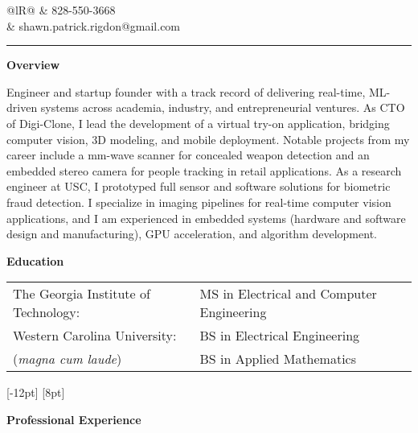\documentclass[14pt,letterpaper]{extarticle}
\begin{document}
\pagestyle{empty}

\newcommand{\newsection}[1]{
\bigskip\medskip
\noindent\textbf{\large{#1}}
}


\noindent
\begin{tabularx}{\linewidth}{@{}lR@{}}
 & \footnotesize{828-550-3668} \\[-4pt]
& \footnotesize{shawn.patrick.rigdon@gmail.com} \\[-4pt]
\end{tabularx}

\smallskip
\noindent\rule[\baselineskip]{\linewidth}{1.5pt}


\noindent\textbf{\large{Overview}}

\medskip
\noindent\footnotesize{Engineer and startup founder with a track record of delivering real-time,
ML-driven systems across academia, industry, and entrepreneurial ventures. As CTO of Digi-Clone,
I lead the development of a virtual try-on application, bridging computer vision, 3D modeling,
and mobile deployment. Notable projects from my career include a mm-wave scanner for concealed
weapon detection and an embedded stereo camera for people tracking in retail applications. As a
research engineer at USC, I prototyped full sensor and software solutions for biometric fraud
detection. I specialize in imaging pipelines for real-time computer vision applications, and I am
experienced in embedded systems (hardware and software design and manufacturing), GPU acceleration,
and algorithm development.}

\newsection{Education}

\medskip\noindent
\begin{tabular}{@{}ll@{}}
\footnotesize{The Georgia Institute of Technology:} & \footnotesize{MS in Electrical and Computer Engineering}\\[5pt]
\footnotesize{Western Carolina University:} & \footnotesize{BS in Electrical Engineering}\\
\footnotesize{(\textit{magna cum laude})} & \footnotesize{BS in Applied Mathematics}\\
\end{tabular}
[-12pt]
[8pt]

\newsection{Professional Experience}

\newcommand{\experience}[4]{
\medskip
\marginnote{\footnotesize{\textit{#1}}}
\noindent\footnotesize{\textbf{#2} \textit{(#3)}}\\
#4
}
\end{document}
